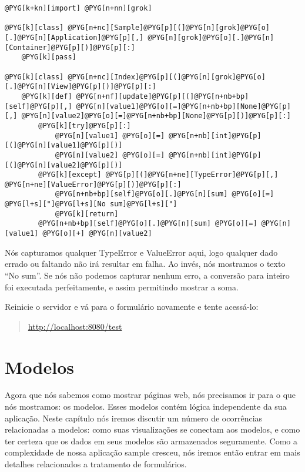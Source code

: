 \documentclass[a4paper,12pt,portuguese]{manual}
\begin{document}
\begin{Verbatim}[commandchars=@\[\]]
@PYG[k+kn][import] @PYG[n+nn][grok]

@PYG[k][class] @PYG[n+nc][Sample]@PYG[p][(]@PYG[n][grok]@PYG[o][.]@PYG[n][Application]@PYG[p][,] @PYG[n][grok]@PYG[o][.]@PYG[n][Container]@PYG[p][)]@PYG[p][:]
    @PYG[k][pass]

@PYG[k][class] @PYG[n+nc][Index]@PYG[p][(]@PYG[n][grok]@PYG[o][.]@PYG[n][View]@PYG[p][)]@PYG[p][:]
    @PYG[k][def] @PYG[n+nf][update]@PYG[p][(]@PYG[n+nb+bp][self]@PYG[p][,] @PYG[n][value1]@PYG[o][=]@PYG[n+nb+bp][None]@PYG[p][,] @PYG[n][value2]@PYG[o][=]@PYG[n+nb+bp][None]@PYG[p][)]@PYG[p][:]
        @PYG[k][try]@PYG[p][:]
            @PYG[n][value1] @PYG[o][=] @PYG[n+nb][int]@PYG[p][(]@PYG[n][value1]@PYG[p][)]
            @PYG[n][value2] @PYG[o][=] @PYG[n+nb][int]@PYG[p][(]@PYG[n][value2]@PYG[p][)]
        @PYG[k][except] @PYG[p][(]@PYG[n+ne][TypeError]@PYG[p][,] @PYG[n+ne][ValueError]@PYG[p][)]@PYG[p][:]
            @PYG[n+nb+bp][self]@PYG[o][.]@PYG[n][sum] @PYG[o][=] @PYG[l+s]["]@PYG[l+s][No sum]@PYG[l+s]["]
            @PYG[k][return]
        @PYG[n+nb+bp][self]@PYG[o][.]@PYG[n][sum] @PYG[o][=] @PYG[n][value1] @PYG[o][+] @PYG[n][value2]
\end{Verbatim}

Nós capturamos qualquer TypeError e ValueError aqui, logo qualquer
dado errado ou faltando não irá resultar em falha. Ao invés, nós
mostramos o texto ``No sum''. Se nós não podemos capturar nenhum erro, a
conversão para inteiro foi executada perfeitamente, e assim permitindo mostrar a soma.

Reinicie o servidor e vá para o formulário novamente e tente
acessá-lo:
\begin{quote}

\href{http://localhost:8080/test}{http://localhost:8080/test}
\end{quote}


\chapter{Modelos}

Agora que nós sabemos como mostrar páginas web, nós precisamos ir para o que nós
mostramos: os modelos. Esses modelos contém lógica independente da
sua aplicação. Neste capítulo nós iremos discutir um número de
ocorrências relacionadas a modelos: como suas visualizações se
conectam aos modelos, e como ter certeza que os dados em seus modelos
são armazenados seguramente. Como a complexidade de nossa aplicação
sample cresceu, nós iremos então entrar em mais detalhes relacionados a
tratamento de formulários.
\end{document}
